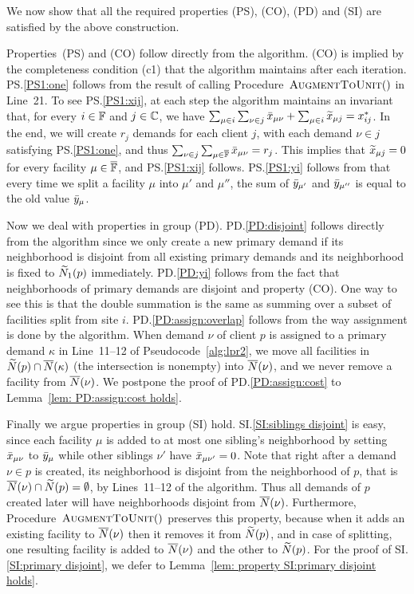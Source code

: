 \documentclass[11pt]{article}
\begin{document}
\medskip

  We now show that all the
required properties (PS), (CO), (PD) and (SI) are satisfied
by the above construction.

Properties~(PS) and (CO) follow directly from the
algorithm. (CO) is implied by the completeness condition
(c1) that the algorithm maintains after each
iteration. PS.\ref{PS1:one} follows from the result of
calling Procedure~${\textsc{AugmentToUnit}}()$ in Line~21. To see
PS.\ref{PS1:xij}, at each step the algorithm maintains an
invariant that, for every $i\in\mathbb{F}$ and
$j\in\mathbb{C}$, we have $\sum_{\mu\in i}\sum_{\nu \in j}
{\bar x}_{\mu \nu} + \sum_{\mu\in i} {\widetilde x}_{\mu j} =
x_{ij}^\ast$. In the end, we will create $r_j$ demands for
each client $j$, with each demand $\nu\in j$ satisfying
PS.\ref{PS1:one}, and thus $\sum_{\nu\in
  j}\sum_{\mu\in\overline{\mathbb{F}}}{\bar x}_{\mu\nu}=r_j$.  This
implies that ${\widetilde x}_{\mu j}=0$ for every facility
$\mu\in\overline{\mathbb{F}}$, and PS.\ref{PS1:xij} follows.
PS.\ref{PS1:yi} follows from that every time we split a
facility $\mu$ into $\mu'$ and $\mu''$, the sum of
${\bar y}_{\mu'}$ and ${\bar y}_{\mu''}$ is equal to the old value
${\bar y}_{\mu}$.

Now we deal with properties in group
(PD). PD.\ref{PD:disjoint} follows directly from the
algorithm since we only create a new primary demand if its
neighborhood is disjoint from all existing primary demands
and its neighborhood is fixed to ${\widetilde N}_1(p)$
immediately. PD.\ref{PD:yi} follows from the fact that
neighborhoods of primary demands are disjoint and property
(CO). One way to see this is that the double summation is
the same as summing over a subset of facilities split from
site $i$. PD.\ref{PD:assign:overlap} follows from the way
assignment is done by the algorithm.  When demand $\nu$ of
client $p$ is assigned to a primary demand $\kappa$ in
Line~11--12 of Pseudocode~\ref{alg:lpr2}, we move all
facilities in ${\widetilde N}(p)\cap {\overline{N}}(\kappa)$ (the
intersection is nonempty) into ${\overline{N}}(\nu)$, and we never
remove a facility from ${\overline{N}}(\nu)$.  We postpone the proof
of PD.\ref{PD:assign:cost} to Lemma~\ref{lem:
  PD:assign:cost holds}.

Finally we argue properties in group (SI)
hold. SI.\ref{SI:siblings disjoint} is easy, since each
facility $\mu$ is added to at most one sibling's
neighborhood by setting ${\bar x}_{\mu\nu}$ to ${\bar y}_\mu$
while other siblings $\nu'$ have ${\bar x}_{\mu\nu'}=0$. Note
that right after a demand $\nu\in p$ is created, its
neighborhood is disjoint from the neighborhood of $p$, that
is ${\overline{N}}(\nu)\cap {\widetilde N}(p) = \emptyset$, by
Lines~11--12 of the algorithm. Thus all demands of $p$
created later will have neighborhoods disjoint from
${\overline{N}}(\nu)$. Furthermore, Procedure~${\textsc{AugmentToUnit}}()$
preserves this property, because when it adds an existing
facility to ${\overline{N}}(\nu)$ then it removes it from
${\widetilde N}(p)$, and in case of splitting, one resulting
facility is added to ${\overline{N}}(\nu)$ and the other to
${\widetilde N}(p)$. For the proof of SI.\ref{SI:primary
  disjoint}, we defer to Lemma~\ref{lem: property SI:primary
  disjoint holds}.
\end{document}
